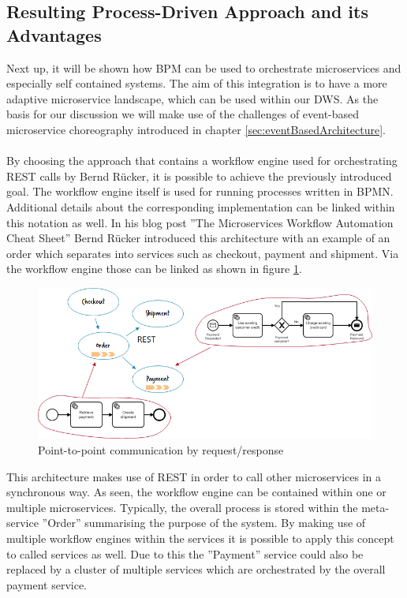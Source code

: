 \subsection{Resulting Process-Driven Approach and its Advantages}
Next up, it will be shown how BPM can be used to orchestrate microservices and especially self contained systems. The aim of this integration is to have a more adaptive microservice landscape, which can be used within our DWS. As the basis for our discussion we will make use of the challenges of event-based microservice choreography introduced in chapter \ref{sec:eventBasedArchitecture}.\newline
\\
\\
By choosing the approach that contains a workflow engine used for orchestrating REST calls by Bernd Rücker, it is possible to achieve the previously introduced goal. The workflow engine itself is used for running processes written in BPMN. Additional details about the corresponding implementation can be linked within this notation as well.\newline
In his blog post ''The Microservices Workflow Automation Cheat Sheet'' Bernd Rücker introduced this architecture with an example of an order which separates into services such as checkout, payment and shipment. Via the workflow engine those can be linked as shown in figure \ref{fig:RestArchitecture}. \cite{orchestrationMicroServices}\newline
\begin{figure}[!htb]
    \centering
    \includegraphics[scale=0.65]{pictures/RestArchitecture.png}
    \caption{Point-to-point communication by request/response \cite{orchestrationMicroServices}}
    \label{fig:RestArchitecture}
\end{figure}
This architecture makes use of REST in order to call other microservices in a synchronous way. As seen, the workflow engine can be contained within one or multiple microservices. \cite{orchestrationMicroServices} Typically, the overall process is stored within the meta-service ''Order'' summarising the purpose of the system. By making use of multiple workflow engines within the services it is possible to apply this concept to called services as well. Due to this the ''Payment'' service could also be replaced by a cluster of multiple services which are orchestrated by the overall payment service.\newline
